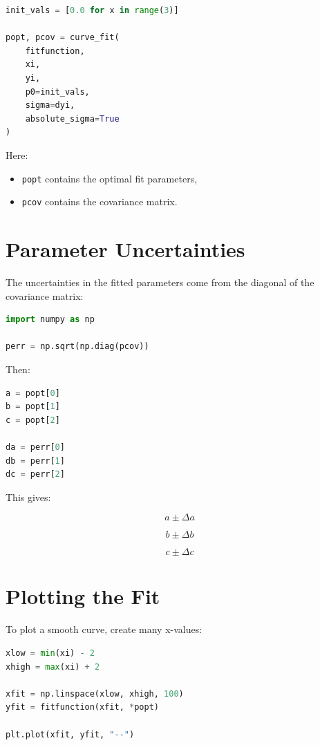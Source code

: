 \documentclass[11pt]{article}
\begin{document}
\begin{lstlisting}[language=Python]
init_vals = [0.0 for x in range(3)]

popt, pcov = curve_fit(
    fitfunction,
    xi,
    yi,
    p0=init_vals,
    sigma=dyi,
    absolute_sigma=True
)
\end{lstlisting}

Here:

\begin{itemize}
    \item \texttt{popt} contains the optimal fit parameters,
    \item \texttt{pcov} contains the covariance matrix.
\end{itemize}

\section{Parameter Uncertainties}

The uncertainties in the fitted parameters come from the diagonal of the covariance matrix:

\begin{lstlisting}[language=Python]
import numpy as np

perr = np.sqrt(np.diag(pcov))
\end{lstlisting}

Then:

\begin{lstlisting}[language=Python]
a = popt[0]
b = popt[1]
c = popt[2]

da = perr[0]
db = perr[1]
dc = perr[2]
\end{lstlisting}

This gives:

\[
a \pm \Delta a
\]

\[
b \pm \Delta b
\]

\[
c \pm \Delta c
\]

\section{Plotting the Fit}

To plot a smooth curve, create many x-values:

\begin{lstlisting}[language=Python]
xlow = min(xi) - 2
xhigh = max(xi) + 2

xfit = np.linspace(xlow, xhigh, 100)
yfit = fitfunction(xfit, *popt)

plt.plot(xfit, yfit, "--")
\end{lstlisting}
\end{document}
